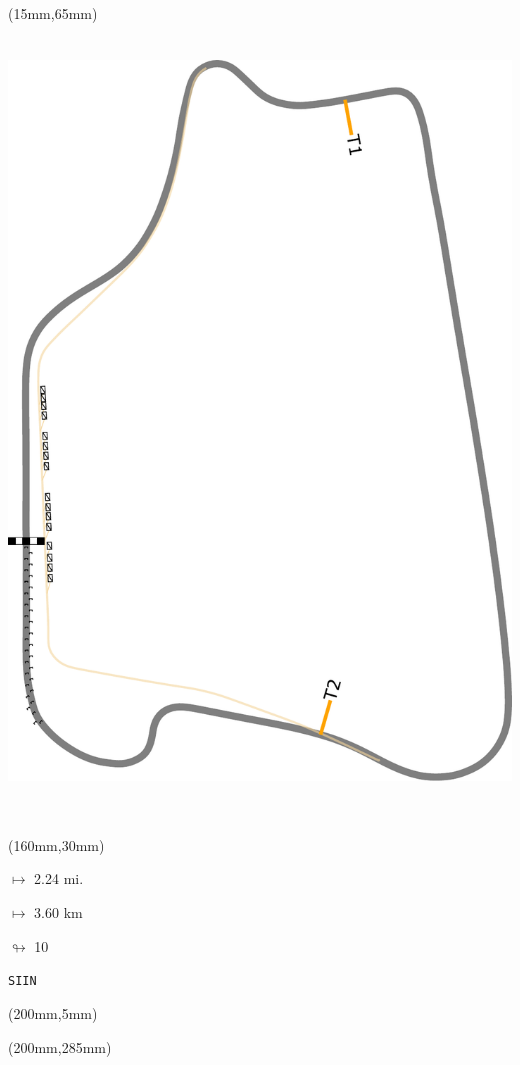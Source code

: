 \begin{textblock*}{185mm}(15mm,65mm)%
\centering
\mbox{\includegraphics[width=185mm,height=210mm,keepaspectratio]{PT/SIIN.pdf}}
\end{textblock*}
\begin{textblock*}{40mm}(160mm,30mm)%
\Large
\par$\mapsto$ 2.24 mi.
\par$\mapsto$ 3.60 km
\par$\looparrowright$ 10
\par\hfill\tiny\tt SIIN\\
\end{textblock*}
\begin{textblock*}{20mm}(200mm,5mm)%
\fbox{\thepage}
\label{SIIN}
\end{textblock*}
\begin{textblock*}{20mm}(200mm,285mm)%
\fbox{\thepage}
\end{textblock*}

